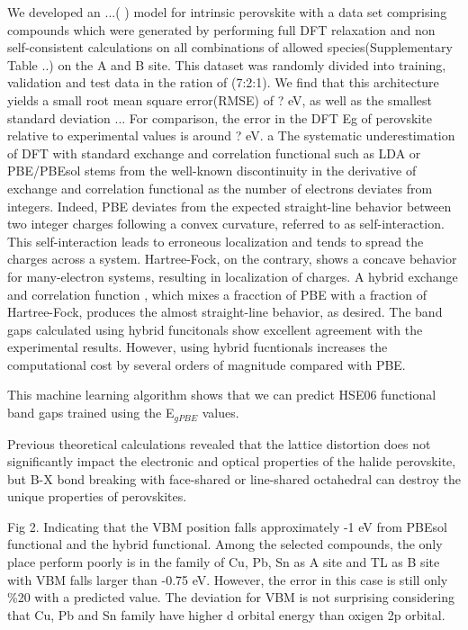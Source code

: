 \documentclass[%
twocolumn,
 amsmath,amssymb,
 aps, citeautoscript,
prb,
]{revtex4-1}
\begin{document}
We developed an ...(   ) model for intrinsic perovskite with a data set comprising compounds which were generated by performing full DFT relaxation and non self-consistent calculations on all combinations of allowed species(Supplementary Table ..) on the A and B site. This dataset was randomly divided into training, validation and test data in the ration of (7:2:1). We find that this architecture yields a small root mean square error(RMSE) of ? eV, as well as the smallest standard deviation ... For comparison, the error in the DFT Eg of perovskite relative to experimental values is around ? eV.   
a
The systematic underestimation of DFT with standard exchange and correlation functional such as LDA or PBE/PBEsol stems from the well-known discontinuity in the derivative of exchange and correlation functional as the number of electrons deviates from integers. Indeed, PBE deviates from the expected straight-line behavior between two integer charges following a convex curvature, referred to as self-interaction. This self-interaction leads to erroneous localization and tends to spread the charges across a system. Hartree-Fock, on the contrary, shows a concave behavior for many-electron systems, resulting in localization of charges. A hybrid exchange and correlation function , which mixes a fracction of PBE with a fraction of Hartree-Fock, produces the almost straight-line behavior, as desired. The band gaps calculated using hybrid funcitonals show excellent agreement with the experimental results. However, using hybrid fucntionals increases the computational cost by several orders of magnitude compared with PBE. 

This machine learning algorithm shows that we can predict HSE06 functional band gaps trained using the E$_{gPBE}$ values. 

Previous theoretical calculations revealed that the lattice distortion does not significantly impact the electronic and optical properties of the halide perovskite, but B-X bond breaking with face-shared or line-shared octahedral can destroy the unique properties of perovskites.

Fig 2. Indicating that the VBM position falls approximately -1 eV from PBEsol functional and the hybrid functional. Among the selected compounds, the only place perform poorly is in the family of Cu, Pb, Sn as A site and TL as B site with VBM falls larger than -0.75 eV.
However, the error in this case is still only \%20 with a predicted value. The deviation for VBM is not surprising considering that Cu, Pb and Sn family have higher d orbital energy than oxigen 2p orbital. 
\end{document}
